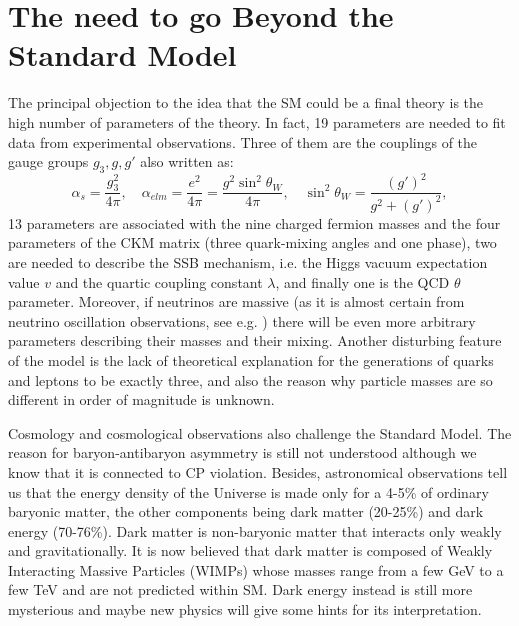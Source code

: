 \section{The need to go Beyond the Standard Model}\label{sect:whyBSM}
The principal objection to the idea that the SM could be a final theory is the high number of parameters of the theory. In fact, 19 parameters are needed to fit data from experimental observations. 
Three of them  are the couplings of the gauge groups $g_3, g, g'$ also written as: \begin{equation}\label{eq:couplings}
\alpha_{s}=\dfrac{g_{3}^{2}}{4\pi} ,\quad \alpha_{elm} = \dfrac{e^{2}}{4\pi} =  \dfrac{g^{2}\sin^{2}\theta_{W}}{4\pi}, \quad \sin^{2}\theta_{W} = \dfrac{(g')^{2}}{g^{2}+(g')^{2}},
\end{equation}
13 parameters are associated with the nine charged fermion masses and the four parameters of the CKM matrix (three quark-mixing angles and one phase), two are needed to describe the SSB mechanism, i.e. the Higgs vacuum expectation value $v$ and the quartic coupling constant $\lambda$, and  finally one is the QCD $\theta$ parameter. Moreover, if neutrinos are massive (as it is almost certain from neutrino oscillation observations, see e.g. \cite{Langacker:817840}) there will be even more arbitrary parameters describing their masses and their mixing. Another disturbing feature of the model is the lack of theoretical explanation for the generations of quarks and leptons to be exactly three, and also the reason why particle masses are so different in order of magnitude is unknown.

Cosmology and cosmological observations also challenge the Standard Model. The reason for baryon-antibaryon asymmetry is still not understood although we know that it is connected to  CP violation. Besides, astronomical observations tell us that the energy density of the Universe is made only for a 4-5\% of ordinary baryonic matter, the other components being dark matter (20-25\%) and dark energy (70-76\%). Dark matter is non-baryonic matter that interacts only weakly and gravitationally. It is now believed that dark matter is composed  of Weakly Interacting Massive Particles (WIMPs) whose masses range from a few GeV to a few TeV and  are not predicted within SM. Dark energy instead is still more mysterious and maybe new physics will give some hints for its interpretation.

